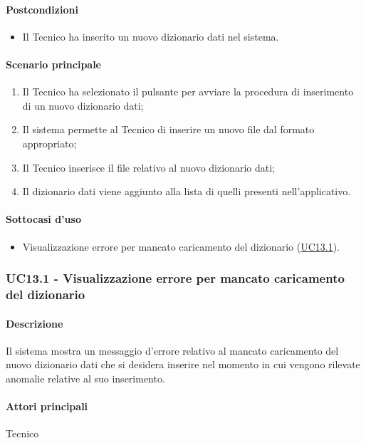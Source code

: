 \paragraph*{Postcondizioni}
\begin{itemize}
  \item Il Tecnico ha inserito un nuovo dizionario dati nel sistema.
\end{itemize}

\paragraph*{Scenario principale}
\begin{enumerate}
  \item Il Tecnico ha selezionato il pulsante per avviare la procedura di inserimento di un nuovo dizionario dati;
  \item Il sistema permette al Tecnico di inserire un nuovo file dal formato appropriato;
  \item Il Tecnico inserisce il file relativo al nuovo dizionario dati;
  \item Il dizionario dati viene aggiunto alla lista di quelli presenti nell’applicativo.  
\end{enumerate}

\paragraph*{Sottocasi d'uso}
\begin{itemize}
  \item Visualizzazione errore per mancato caricamento del dizionario (\hyperref[UC13point1]{UC13.1}).
\end{itemize}


\subsubsection{UC13.1 - Visualizzazione errore per mancato caricamento del dizionario}\label{UC13point1}
\paragraph*{Descrizione} Il sistema mostra un messaggio d’errore relativo al mancato caricamento del nuovo dizionario dati che si desidera inserire nel momento in cui vengono rilevate anomalie relative al suo inserimento.
\paragraph*{Attori principali} Tecnico
